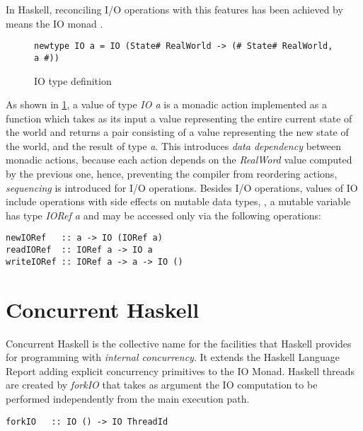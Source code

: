 In Haskell, reconciling I/O operations with this features has been achieved by means the IO monad \cite{PeytonJones:1993:IFP:158511.158524}.
\begin{figure}
\begin{lstlisting}
newtype IO a = IO (State# RealWorld -> (# State# RealWorld, a #))
\end{lstlisting}
\caption{IO type definition}
\label{fig:io}
\end{figure}
As shown in \cref{fig:io}, a value of type \emph{IO a} is a monadic action implemented as a function which takes as its input a value representing the entire current state of the world and returns a pair consisting of a value representing the new state of the world, and the result of type \emph{a}.
This introduces \emph{data dependency} between monadic actions, because each action depends on the \emph{RealWord} value computed by the previous one, hence, preventing the compiler from reordering actions, \emph{sequencing} is introduced for I/O operations.
Besides I/O operations, values of IO include operations with side effects on mutable data types, \eg, a mutable variable has type \emph{IORef a} and may be accessed only via the following operations:

\begin{lstlisting}
newIORef   :: a -> IO (IORef a)
readIORef  :: IORef a -> IO a
writeIORef :: IORef a -> a -> IO ()
\end{lstlisting}

\section{Concurrent Haskell}
Concurrent Haskell is the collective name for the facilities that Haskell provides for programming with \emph{internal concurrency}.
It extends the Haskell Language Report adding explicit concurrency primitives to the IO Monad.
Haskell threads are created by \emph{forkIO} that takes as argument the IO computation to be performed independently from the main execution path.
\begin{lstlisting}
forkIO   :: IO () -> IO ThreadId
\end{lstlisting}

